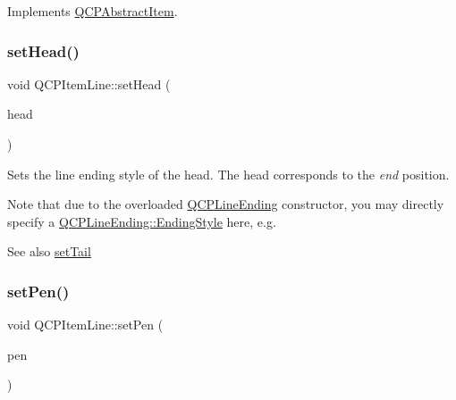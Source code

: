 Implements \mbox{\hyperlink{class_q_c_p_abstract_item_ae41d0349d68bb802c49104afd100ba2a}{Q\+C\+P\+Abstract\+Item}}.

\mbox{\label{class_q_c_p_item_line_aebf3d687114d584e0459db6759e2c3c3}} 
\subsubsection{\texorpdfstring{setHead()}{setHead()}}
{\footnotesize\ttfamily void Q\+C\+P\+Item\+Line\+::set\+Head (\begin{DoxyParamCaption}\item[{const \mbox{\hyperlink{class_q_c_p_line_ending}{Q\+C\+P\+Line\+Ending}} \&}]{head }\end{DoxyParamCaption})}

Sets the line ending style of the head. The head corresponds to the {\itshape end} position.

Note that due to the overloaded \mbox{\hyperlink{class_q_c_p_line_ending}{Q\+C\+P\+Line\+Ending}} constructor, you may directly specify a \mbox{\hyperlink{class_q_c_p_line_ending_a5ef16e6876b4b74959c7261d8d4c2cd5}{Q\+C\+P\+Line\+Ending\+::\+Ending\+Style}} here, e.\+g.
\begin{DoxyCode}{0}
\end{DoxyCode}


\begin{DoxySeeAlso}{See also}
\mbox{\hyperlink{class_q_c_p_item_line_ac264222c3297a7efe33df9345c811a5f}{set\+Tail}} 
\end{DoxySeeAlso}
\mbox{\label{class_q_c_p_item_line_a572528dab61c1abe205822fbd5db4b27}} 
\subsubsection{\texorpdfstring{setPen()}{setPen()}}
{\footnotesize\ttfamily void Q\+C\+P\+Item\+Line\+::set\+Pen (\begin{DoxyParamCaption}\item[{const Q\+Pen \&}]{pen }\end{DoxyParamCaption})}

